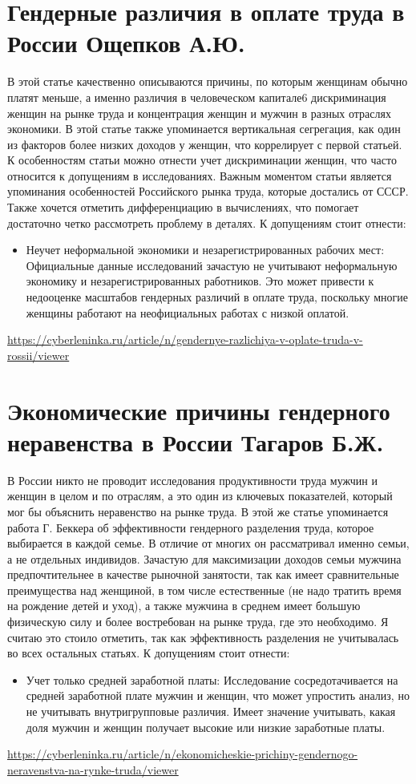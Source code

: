 \documentclass[a4paper,14pt]{article}
\begin{document}
\section{Гендерные различия в оплате труда в России Ощепков А.Ю.}
В этой статье качественно описываются причины, по которым женщинам обычно платят меньше, а именно различия в человеческом капитале6 дискриминация женщин на рынке труда и концентрация женщин и мужчин в разных отраслях экономики. В этой статье также упоминается вертикальная сегрегация, как один из факторов более низких доходов у женщин, что коррелирует с первой статьей. К особенностям статьи можно отнести учет дискриминации женщин, что часто относится к допущениям в исследованиях. Важным моментом статьи является упоминания особенностей Российского рынка труда, которые достались от СССР. 
Также хочется отметить дифференциацию в вычислениях, что помогает достаточно четко рассмотреть проблему в деталях.
К допущениям стоит отнести:
\begin{itemize}
    \item Неучет неформальной экономики и незарегистрированных рабочих мест: Официальные данные исследований зачастую не учитывают неформальную экономику и незарегистрированных работников. Это может привести к недооценке масштабов гендерных различий в оплате труда, поскольку многие женщины работают на неофициальных работах с низкой оплатой.
\end{itemize}
\url{https://cyberleninka.ru/article/n/gendernye-razlichiya-v-oplate-truda-v-rossii/viewer }
\section{Экономические причины гендерного неравенства в России Тагаров Б.Ж.}
В России никто не проводит исследования продуктивности труда мужчин и женщин в целом и по отраслям, а это один из ключевых показателей, который мог бы объяснить неравенство на рынке труда. В этой же статье упоминается работа Г. Беккера об эффективности гендерного разделения труда, которое выбирается в каждой семье. В отличие от многих он рассматривал именно семьи, а не отдельных индивидов. Зачастую для максимизации доходов семьи мужчина предпочтительнее в качестве рыночной занятости, так как имеет сравнительные преимущества над женщиной, в том числе естественные (не надо тратить время на рождение детей и уход), а также мужчина в среднем имеет большую физическую силу и более востребован на рынке труда, где это необходимо. Я считаю это стоило отметить, так как эффективность разделения не учитывалась во всех остальных статьях.
К допущениям стоит отнести:
\begin{itemize}
    \item Учет только средней заработной платы: Исследование сосредотачивается на средней заработной плате мужчин и женщин, что может упростить анализ, но не учитывать внутригрупповые различия. Имеет значение учитывать, какая доля мужчин и женщин получает высокие или низкие заработные платы.
\end{itemize}
\url{https://cyberleninka.ru/article/n/ekonomicheskie-prichiny-gendernogo-neravenstva-na-rynke-truda/viewer}
\end{document}
